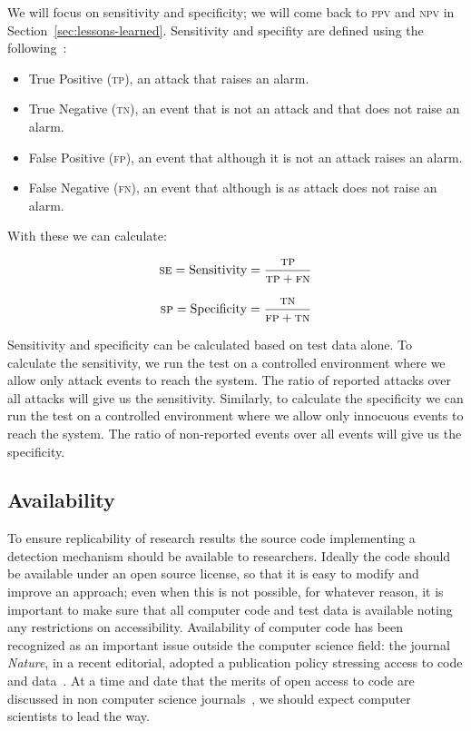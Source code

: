 \documentclass[conference]{IEEEtran}
\begin{document}
We will focus on sensitivity and specificity; we will come back to
\textsc{ppv} and \textsc{npv} in Section~\ref{sec:lessons-learned}.
Sensitivity and specifity are defined using the following~\cite{linn2004}:
\begin{itemize}
\item True Positive (\textsc{tp}), an attack that raises an alarm.
\item True Negative (\textsc{tn}), an event that is not an attack and that does
  not raise an alarm.
\item False Positive (\textsc{fp}), an event that although it is not an attack
  raises an alarm.
\item False Negative (\textsc{fn}), an event that although is as attack does
  not raise an alarm.
\end{itemize}

\noindent
With these we can calculate:

\begin{equation}
  \textsc{se} = \textrm{Sensitivity} = \frac{\textsc{tp}}{\textsc{tp}
    + \textsc{fn}}
\label{eq:sensitivity}
\end{equation}

\begin{equation}
  \textsc{sp} = \textrm{Specificity} = \frac{\textsc{tn}}{\textsc{fp}
    + \textsc{tn}}
\label{eq:specificity}
\end{equation}

\noindent
Sensitivity and specificity can be calculated based on test
data alone. To calculate the sensitivity, we run the test on a
controlled environment where we allow only attack events to reach the
system. The ratio of reported attacks over all attacks will give us
the sensitivity. Similarly, to calculate the specificity we can run
the test on a controlled environment where we allow only innocuous
events to reach the system. The ratio of non-reported events over all
events will give us the specificity. 

\subsection{Availability}

To ensure replicability of research results the source code
implementing a detection mechanism should be available to researchers.
Ideally the code should be available under an open source license, so
that it is easy to modify and improve an approach; even when this is
not possible, for whatever reason, it is important to make sure that
all computer code and test data is available noting any restrictions
on accessibility. Availability of computer code has been recognized as
an important issue outside the computer science field: the journal
\emph{Nature}, in a recent editorial, adopted a publication policy stressing
access to code and data~\cite{nature2014}. At a time and date that the
merits of open access to code are discussed in non computer science
journals~\cite{easterbrook2014}, we should expect computer scientists
to lead the way.
 
\end{document}
